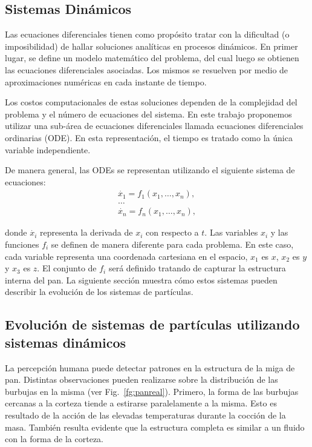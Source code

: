 \documentclass[spanish,a4paper,11pt,oneside,links]{report}
\begin{document}
\subsection{Sistemas Din\'amicos}

Las ecuaciones diferenciales tienen como prop\'osito tratar con la dificultad (o imposibilidad) de hallar soluciones anal\'iticas en procesos din\'amicos. En primer lugar, se define un modelo matem\'atico del problema, del cual luego se obtienen 
las ecuaciones diferenciales asociadas. Los mismos se resuelven por medio de aproximaciones num\'ericas en cada instante de tiempo.

Los costos computacionales de estas soluciones dependen de la complejidad del problema y el n\'umero de ecuaciones del sistema. En este trabajo proponemos utilizar una sub-\'area de ecuaciones diferenciales llamada ecuaciones diferenciales ordinarias (ODE). En esta representaci\'on, el tiempo es tratado como la \'unica variable independiente.


De manera general, las ODEs se representan utilizando el siguiente sistema de ecuaciones:
\begin{equation} \label{eq:simple}  
  \begin{aligned}
    \dot{x_{1}} = f_{1}(x_{1},\ldots,x_{n}),\\
    \ldots\\
    \dot{x_{n}} = f_{n}(x_{1},\ldots,x_{n}),
  \end{aligned}
\end{equation}

\noindent donde $\dot{x_{i}}$ representa la derivada de $x_{i}$ con respecto
a $t$. Las variables $x_{i}$ y las funciones $f_{i}$ se definen de manera diferente para cada problema. En este caso, cada variable representa una coordenada cartesiana en el espacio, $x_{1}$ es $x$, $x_{2}$ es $y$ y $x_{3}$ es $z$. El conjunto de $f_{i}$ ser\'a definido tratando de capturar la estructura interna del pan. La siguiente secci\'on muestra cómo estos sistemas pueden describir la evoluci\'on de los sistemas de part\'iculas.

\subsection{Evoluci\'on de sistemas de part\'iculas utilizando sistemas din\'amicos}

La percepci\'on humana puede detectar patrones en la estructura de la miga de pan. Distintas observaciones pueden realizarse sobre la distribuci\'on de las burbujas en la misma (ver Fig.~\ref{fg:panreal}). Primero, la forma de las burbujas cercanas a la corteza tiende a estirarse paralelamente a la misma. Esto es resultado de la acci\'on de las elevadas temperaturas durante la cocci\'on de la masa. Tambi\'en resulta evidente que la estructura completa es similar a un fluido con la forma de la corteza.
\end{document}

